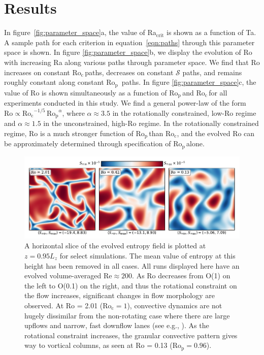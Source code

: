 \documentclass[twocolumn, amsmath, amsfonts, amssymb, trackchanges]{aastex62}
\newcommand{\pro}{\ensuremath{\text{Ro}_{\text{p}}}}
\newcommand{\con}{\ensuremath{\text{Ro}_{\text{c}}}}
\begin{document}
\section{Results}
\label{sec:results}
In figure~\ref{fig:parameter_space}a, the value of Ra$_{\text{crit}}$
is shown as a function of Ta.
A sample path for
each criterion in equation~\ref{eqn:paths} through
this parameter space is shown.
In figure \ref{fig:parameter_space}b, we display the evolution of Ro
with increasing Ra along various paths through parameter space.
We find that Ro increases on constant \con$\,$paths, decreases on constant $\mathcal{S}$
paths, and remains roughly constant along constant \pro$\,$ paths.
In figure \ref{fig:parameter_space}c, the value of Ro is shown simultaneously as
a function of \pro$\,$and \con$\,$for all experiments conducted in this study.
We find a general power-law of the form \mbox{$\text{Ro} \propto \con^{-1/5}\,\pro^{\alpha}$},
where $\alpha \approx 3.5$ in the rotationally constrained, low-Ro regime and
\mbox{$\alpha \approx 1.5$} in the unconstrained, high-Ro regime. 
In the rotationally constrained regime, Ro is a much stronger function of 
$\pro\,$than $\con$, and the
evolved Ro can be approximately determined through specification of \pro$\,$alone.


\begin{figure}[t]
    \includegraphics[width=\textwidth]{dynamics_plot.pdf}
    \caption{ A horizontal slice of the evolved entropy field is plotted at $z = 0.95L_z$
    for select simulations. The mean value of entropy at this height has been removed in all
    cases. All runs displayed here have an evolved volume-averaged $\text{Re} \approx 200$. 
    As Ro decreases from O(1) on the left to O(0.1) on the right, and thus the rotational
    constraint on the flow increases, significant changes in flow morphology are observed.
    At Ro = 2.01 ($\con = 1$), convective dynamics are not hugely dissimilar from the non-rotating
    case where there are large upflows and narrow, fast downflow lanes (see e.g., \AB).
    As the rotational constraint increases, the granular convective pattern gives way
    to vortical columns, as seen at Ro = 0.13 ($\pro = 0.96$).
    \label{fig:pretty_convection} }
\end{figure}
\end{document}
